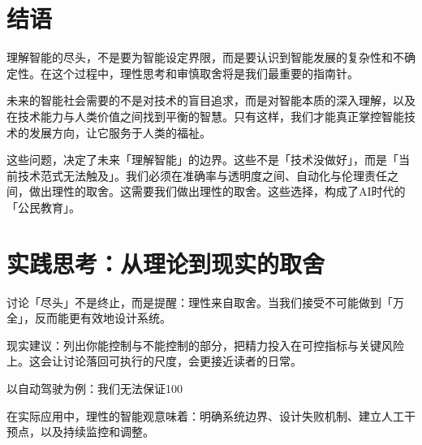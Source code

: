\section{结语}

理解智能的尽头，不是要为智能设定界限，而是要认识到智能发展的复杂性和不确定性。在这个过程中，理性思考和审慎取舍将是我们最重要的指南针。

未来的智能社会需要的不是对技术的盲目追求，而是对智能本质的深入理解，以及在技术能力与人类价值之间找到平衡的智慧。只有这样，我们才能真正掌控智能技术的发展方向，让它服务于人类的福祉。

这些问题，决定了未来「理解智能」的边界。这些不是「技术没做好」，而是「当前技术范式无法触及」。我们必须在准确率与透明度之间、自动化与伦理责任之间，做出理性的取舍。这需要我们做出理性的取舍。这些选择，构成了AI时代的「公民教育」。

\section{实践思考：从理论到现实的取舍}

讨论「尽头」不是终止，而是提醒：理性来自取舍。当我们接受不可能做到「万全」，反而能更有效地设计系统。

现实建议：列出你能控制与不能控制的部分，把精力投入在可控指标与关键风险上。这会让讨论落回可执行的尺度，会更接近读者的日常。

以自动驾驶为例：我们无法保证100%

在实际应用中，理性的智能观意味着：明确系统边界、设计失败机制、建立人工干预点，以及持续监控和调整。

\nocite{*}
\printbibliography[heading=bibintoc, title=\ebibname]
\newpage
